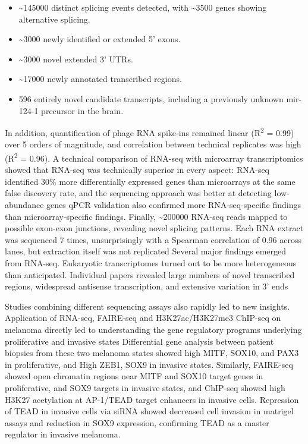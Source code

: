 \begin{itemize}[noitemsep]
	\item \textasciitilde{\num{145000}} distinct splicing events detected, with \textasciitilde{\num{3500}} genes showing alternative splicing.
	\item \textasciitilde{\num{3000}} newly identified or extended 5' exons.
	\item \textasciitilde{\num{3000}} novel extended 3' UTRs.
	\item \textasciitilde{\num{17000}} newly annotated transcribed regions.
	\item \num{596} entirely novel candidate transcripts, including a previously unknown mir-124-1 precursor in the brain.
\end{itemize}

In addition, quantification of phage {}{} RNA spike-ins remained linear (R\textsuperscript{2} = 0.99) over 5 orders of magnitude, and correlation between technical replicates was high (R\textsuperscript{2} = 0.96). A technical comparison of RNA-seq with microarray transcriptomics showed that RNA-seq was technically superior in every aspect: RNA-seq identified 30\% more differentially expressed genes than microarrays at the same false discovery rate, and the sequencing approach was better at detecting low-abundance genes qPCR validation also confirmed more RNA-seq-specific findings than microarray-specific findings. Finally, \textasciitilde{\num{200000}} RNA-seq reads mapped to possible exon-exon junctions, revealing novel splicing patterns. Each RNA extract was sequenced 7 times, unsurprisingly with a Spearman correlation of 0.96 across lanes, but extraction itself was not replicated Several major findings emerged from RNA-seq. Eukaryotic transcriptomes turned out to be more heterogeneous than anticipated. Individual papers revealed large numbers of novel transcribed regions, widespread antisense transcription, and extensive variation in 3' ends


Studies combining different sequencing assays also rapidly led to new insights. Application of RNA-seq, FAIRE-seq and H3K27ac/H3K27me3 ChIP-seq on melanoma directly led to understanding the gene regulatory programs underlying proliferative and invasive states Differential gene analysis between patient biopsies from these two melanoma states showed high MITF, SOX10, and PAX3 in proliferative, and High ZEB1, SOX9 in invasive states. Similarly, FAIRE-seq showed open chromatin regions near MITF and SOX10 target genes in proliferative, and SOX9 targets in invasive states, and ChIP-seq showed high H3K27 acetylation at AP-1/TEAD target enhancers in invasive cells. Repression of TEAD in invasive cells via siRNA showed decreased cell invasion in matrigel assays and reduction in SOX9 expression, confirming TEAD as a master regulator in invasive melanoma.

